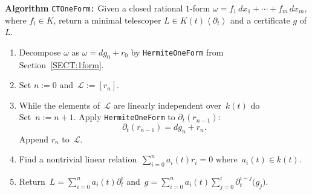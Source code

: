 \documentclass{amsart}
\theoremstyle{definition}
\numberwithin{equation}{section}
\numberwithin{thm}{section}
\begin{document}
 

\medskip
\noindent
	\textbf{Algorithm} \texttt{CTOneForm:}
	Given a closed rational $1$-form $\omega = f_1 \, dx_1+\cdots+ f_m \, dx_m$, where $f_i \in K$, return a minimal telescoper $L\in K(t)\left\langle \partial_t\right\rangle$ and a certificate $g$ of $L$.
\begin{enumerate}
\item Decompose $\omega$ as $\omega= dg_0+ r_0$ by \texttt{HermiteOneForm} from Section~\ref{SECT:1form}.
\item Set $n:=0$ and~$\mathcal{L} := [r_n]$.
\item 
While the elements of~$\mathcal{L}$ are linearly independent over~$k(t)$ do \\
\indent Set~$n:=n+1$. Apply \texttt{HermiteOneForm} to $\partial_t(r_{n-1})$:
\[
    \partial_t(r_{n-1}) = dg_{n} + r_{n}.
\]
\indent Append $r_{n}$ to~$\mathcal{L}$.
\item Find a nontrivial linear relation~$\sum_{i=0}^n a_i(t) r_i = 0$ where~$a_i(t) \in k(t)$.
\item Return~$L = \sum_{i=0}^n a_i(t) \partial_t^i$ and~$g =\sum_{i=0}^n a_i(t) \sum_{j=0}^i \partial_t^{i-j}\bigl(g_{j}\bigr)$.
\end{enumerate}
\end{document}
